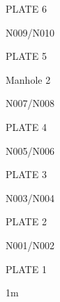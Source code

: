 \documentclass[a4paper,portrait,12pt]{article}
\begin{document}
\begin{flushleft}
PLATE 6
\end{flushleft}


\begin{flushleft}
N009/N010
\end{flushleft}





\begin{flushleft}
PLATE 5
\end{flushleft}


\begin{flushleft}
Manhole 2
\end{flushleft}





\begin{flushleft}
N007/N008
\end{flushleft}





\begin{flushleft}
PLATE 4
\end{flushleft}


\begin{flushleft}
N005/N006
\end{flushleft}





\begin{flushleft}
PLATE 3
\end{flushleft}


\begin{flushleft}
N003/N004
\end{flushleft}





\begin{flushleft}
PLATE 2
\end{flushleft}


\begin{flushleft}
N001/N002
\end{flushleft}





\begin{flushleft}
PLATE 1
\end{flushleft}


\begin{flushleft}
1m
\end{flushleft}
\end{document}
